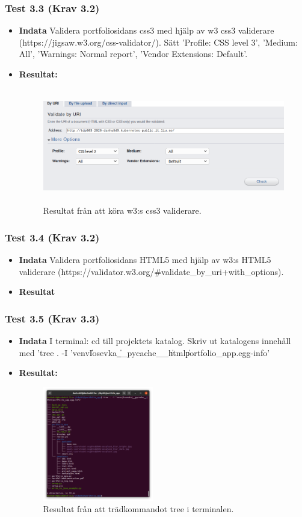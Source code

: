 \documentclass{TDP003mall}
\begin{document}
\subsubsection*{Test 3.3 (Krav 3.2)}
\begin{itemize}
\item[]\textbf{Indata} Validera portfoliosidans css3 med hjälp av w3 css3 validerare (https://jigsaw.w3.org/css-validator/). Sätt 'Profile: CSS level 3', 'Medium: All', 'Warnings: Normal report', 'Vendor Extensions: Default'.
\item[]\textbf{Resultat:}
\begin{figure}[h]
\centerline{\includegraphics[width=\textwidth, height=5cm]{../Pictures/css3_validation.png}}
\caption{Resultat från att köra w3:s css3 validerare.\label{fig:}}
\end{figure}
\end{itemize}
\subsubsection*{Test 3.4 (Krav 3.2)}
\begin{itemize}
\item[]\textbf{Indata} Validera portfoliosidans HTML5 med hjälp av w3:s HTML5 validerare (https://validator.w3.org/\#validate\_by\_uri+with\_options). 
\item[]\textbf{Resultat} 
\end{itemize}
\subsubsection*{Test 3.5 (Krav 3.3)}
\begin{itemize}
\item[]\textbf{Indata} I terminal: cd till projektets katalog. Skriv ut katalogens innehåll med 'tree . -I 'venv\|Iosevka\|\_\_pycache\_\_\|html\|portfolio\_app.egg-info'
\item[]\textbf{Resultat:}
  \begin{figure}[h]
\centerline{\includegraphics[width=\textwidth, height=5cm]{../Pictures/app_tree.png}}
\caption{Resultat från att trädkommandot tree i terminalen.\label{fig:}}
\end{figure}
\end{itemize}
\end{document}
